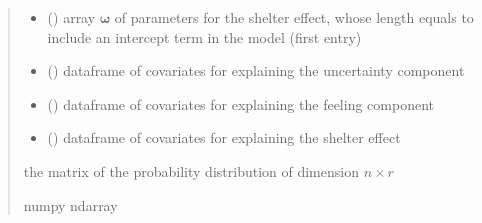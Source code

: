 \documentclass[letterpaper,10pt,english]{sphinxmanual}
\begin{document}
\begin{fulllineitems}
\begin{quote}
\begin{description}
\begin{itemize}
\item {} 
\sphinxAtStartPar
{} () \textendash{} array \(\pmb \omega\) of parameters for the shelter effect, whose length equals 
 to include an intercept term in the model (first entry)

\item {} 
\sphinxAtStartPar
{} () \textendash{} dataframe of covariates for explaining the uncertainty component

\item {} 
\sphinxAtStartPar
{} () \textendash{} dataframe of covariates for explaining the feeling component

\item {} 
\sphinxAtStartPar
{} () \textendash{} dataframe of covariates for explaining the shelter effect

\end{itemize}

\sphinxAtStartPar
the matrix of the probability distribution of dimension \(n \times r\)

\sphinxAtStartPar
numpy ndarray

\end{description}\end{quote}

\end{fulllineitems}

\end{document}
